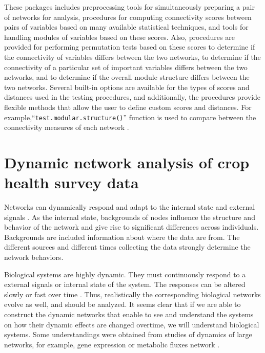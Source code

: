 These packages includes preprocessing tools for simultaneously preparing a pair of networks for analysis, procedures for computing connectivity scores between pairs of variables based on many available statistical techniques, and tools for handling modules of variables based on these scores. Also, procedures are provided for performing permutation tests based on these scores to determine if the connectivity of variables differs between the two networks, to determine if the connectivity of a particular set of important variables differs between the two networks, and to determine if the overall module structure differs between the two networks. Several built-in options are available for the types of scores and distances used in the testing procedures, and additionally, the procedures provide flexible methods that allow the user to define custom scores and distances. For example,``\texttt{test.modular.structure()}'' function is used to compare between the connectivity measures of each network . 



 

\section*{Dynamic network analysis of crop health survey data}
Networks can dynamically respond and adapt to the internal state and external signals . As the internal state, backgrounds of nodes influence the structure and behavior of the network and give rise to significant differences across individuals. Backgrounds are included information about where the data are from. The different sources and different times collecting the data strongly determine the network behaviors. 


Biological systems are highly dynamic. They must continuously respond to a external signals or internal state of the system. The responses can be altered slowly or fast over time . Thus, realistically the corresponding biological networks evolve as well, and should be analyzed.  It seems clear that if we are able to construct the dynamic networks that enable to see and understand the systems on how their dynamic effects are changed overtime, we will understand biological systems. Some understandings were obtained from studies of dynamics of large networks, for example, gene expression or metabolic fluxes network .
 
